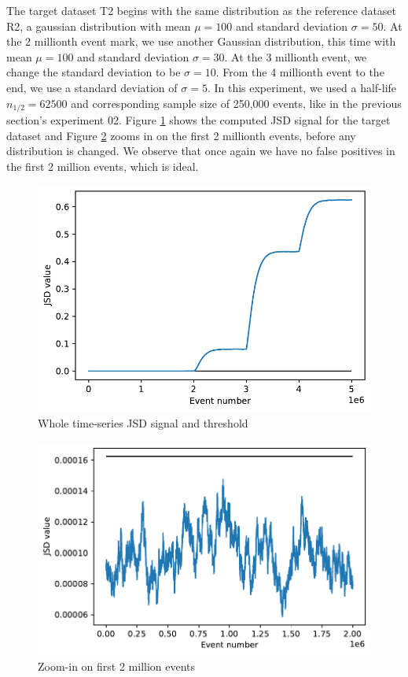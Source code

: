 \documentclass[sigconf]{acmart}
\begin{document}
The target dataset T2 begins with the same distribution as the reference dataset R2, a gaussian distribution with mean $\mu=100$ and standard deviation $\sigma=50$. At the 2 millionth event mark, we use another Gaussian distribution, this time with mean $\mu=100$ and standard deviation $\sigma=30$. At the 3 millionth event, we change the standard deviation to be $\sigma=10$. From the 4 millionth event to the end, we use a standard deviation of $\sigma=5$. In this experiment, we used a half-life $n_{1/2}=62500$ and corresponding sample size of 250,000 events, like in the previous section's experiment 02. Figure \ref{fig:JSD-signal-test02} shows the computed JSD signal for the target dataset and Figure \ref{fig:JSD-signal-zoom-test02} zooms in on the first 2 millionth events, before any distribution is changed. We observe that once again we have no false positives in the first 2 million events, which is ideal. 
\begin{figure}[!htb]
    \begin{center}
      \includegraphics[scale=0.5]{figures/stream-analysis-viz-test02.pdf}
      \caption{Whole time-series JSD signal and threshold}
      \label{fig:JSD-signal-test02}
    \end{center}
\end{figure}
\begin{figure}[!htb]
    \begin{center}
      \includegraphics[scale=0.5]{figures/stream-analysis-viz-zoom-test02.pdf}
      \caption{Zoom-in on first 2 million events}
     \label{fig:JSD-signal-zoom-test02}
    \end{center}
\end{figure}
\end{document}
